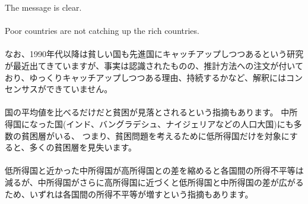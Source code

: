 \begin{frame}[t, label=ConvergenceResults]{}
The message is clear.\\~\\
Poor countries are not catching up the rich countries.\\~\\
\pause
なお、1990年代以降は貧しい国も先進国にキャッチアップしつつあるという研究が最近出てきています\citep{KremerWillisYou2022}が、事実は認識されたものの、推計方法への注文が付いており\citep{AcemogluMolina2021}、ゆっくりキャッチアップしつつある理由、持続するかなど、解釈にはコンセンサスができていません。\hfill\hyperlink{NonConvergence}{}\\~\\

\pause
国の平均値を比べるだけだと貧困が見落とされるという指摘もあります\citep{PandeEnevoldsen2021}。
\pause
中所得国になった国(インド、バングラデシュ、ナイジェリアなどの人口大国)にも多数の貧困層がいる、\pause
つまり、貧困問題を考えるために低所得国だけを対象にすると、多くの貧困層を見失います。\\~\\

低所得国と近かった中所得国が高所得国との差を縮めると各国間の所得不平等は減るが、中所得国がさらに高所得国に近づくと低所得国と中所得国の差が広がるため、いずれは各国間の所得不平等が増すという指摘もあります\citep{Kanbur2022}。
\end{frame}

